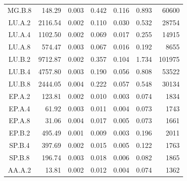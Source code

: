 \begin{ThreePartTable}
\begin{longtable}[c]{@{\extracolsep{\fill}}c*{6}{r}}
    MG.B.8                 & 148.29                              & 0.003                               & 0.442          & 0.116 & 0.893 & 60600  \\
    LU.A.2                 & 2116.54                             & 0.002                               & 0.110          & 0.030 & 0.532 & 28754  \\
    LU.A.4                 & 1102.50                             & 0.002                               & 0.069          & 0.017 & 0.255 & 14915  \\
    LU.A.8                 & 574.47                              & 0.003                               & 0.067          & 0.016 & 0.192 & 8655   \\
    LU.B.2                 & 9712.87                             & 0.002                               & 0.357          & 0.104 & 1.734 & 101975 \\
    LU.B.4                 & 4757.80                             & 0.003                               & 0.190          & 0.056 & 0.808 & 53522  \\
    LU.B.8                 & 2444.05                             & 0.004                               & 0.222          & 0.057 & 0.548 & 30134  \\
    EP.A.2                 & 123.81                              & 0.002                               & 0.010          & 0.003 & 0.074 & 1834   \\
    EP.A.4                 & 61.92                               & 0.003                               & 0.011          & 0.004 & 0.073 & 1743   \\
    EP.A.8                 & 31.06                               & 0.004                               & 0.017          & 0.005 & 0.073 & 1661   \\
    EP.B.2                 & 495.49                              & 0.001                               & 0.009          & 0.003 & 0.196 & 2011   \\
    SP.B.4                 & 397.69                              & 0.002                               & 0.015          & 0.005 & 0.122 & 1763   \\
    SP.B.8                 & 196.74                              & 0.003                               & 0.018          & 0.006 & 0.082 & 1865   \\
    AA.A.2                 & 13.81                               & 0.002                               & 0.012          & 0.004 & 0.074 & 1362   \\

\end{longtable}
\end{ThreePartTable}
